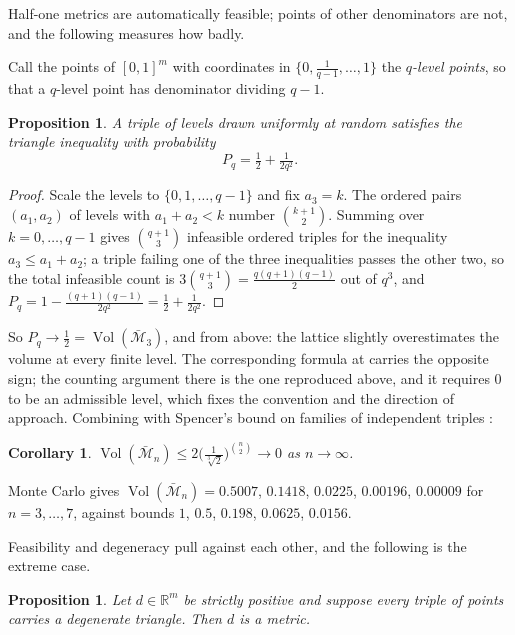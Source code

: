 \documentclass[11pt]{article}
\newtheorem{proposition}[theorem]{Proposition}
\newtheorem{corollary}[theorem]{Corollary}
\theoremstyle{definition}
\theoremstyle{remark}
\newcommand{\R}{\mathbb{R}}
\newcommand{\bM}{\bar{\mathcal{M}}}
\begin{document}
Half-one metrics are automatically feasible; points of other denominators are not, and the
following measures how badly.

Call the points of $[0,1]^m$ with coordinates in $\{0,\tfrac1{q-1},\ldots,1\}$ the
\emph{$q$-level points}, so that a $q$-level point has denominator dividing $q-1$.

\begin{proposition}\label{prop:Pq}
A triple of levels drawn uniformly at random satisfies the triangle inequality with
probability
\[
P_q=\tfrac12+\tfrac1{2q^2}.
\]
\end{proposition}

\begin{proof}
Scale the levels to $\{0,1,\ldots,q-1\}$ and fix $a_3=k$. The ordered pairs $(a_1,a_2)$ of
levels with $a_1+a_2<k$ number $\binom{k+1}2$. Summing over $k=0,\ldots,q-1$ gives
$\binom{q+1}3$ infeasible ordered triples for the inequality $a_3\leq a_1+a_2$; a triple
failing one of the three inequalities passes the other two, so the total infeasible count is
$3\binom{q+1}3=\tfrac{q(q+1)(q-1)}2$ out of $q^3$, and
$P_q=1-\tfrac{(q+1)(q-1)}{2q^2}=\tfrac12+\tfrac1{2q^2}$.
\end{proof}

So $P_q\to\tfrac12=\operatorname{Vol}(\bM_3)$, and from above: the lattice slightly
overestimates the volume at every finite level. The corresponding formula at
\cite[(5.2.1)]{Kehoe19} carries the opposite sign; the counting argument there is the one
reproduced above, and it requires $0$ to be an admissible level, which fixes the convention
and the direction of approach. Combining with Spencer's bound on families of independent
triples \cite{Spencer68}:

\begin{corollary}\label{cor:vol}
$\operatorname{Vol}(\bM_n)\leq2\bigl(\tfrac1{\sqrt[3]2}\bigr)^{\binom n2}\to0$ as
$n\to\infty$.
\end{corollary}

Monte Carlo gives $\operatorname{Vol}(\bM_n)=0.5007$, $0.1418$, $0.0225$, $0.00196$,
$0.00009$ for $n=3,\ldots,7$, against bounds $1$, $0.5$, $0.198$, $0.0625$, $0.0156$.

Feasibility and degeneracy pull against each other, and the following is the extreme case.

\begin{proposition}\label{prop:degen}
Let $d\in\R^m$ be strictly positive and suppose every triple of points carries a degenerate
triangle. Then $d$ is a metric.
\end{proposition}
\end{document}
